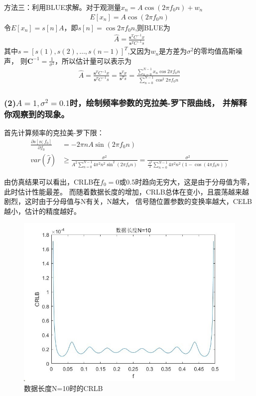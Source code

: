 \documentclass[fontset=windows]{article}
\numberwithin{figure}{section}
\begin{document}
方法三：利用BLUE求解。对于观测量\(x_n=A\cos(2\pi f_0 n)+w_n\)
\begin{align*}
	E[x_n]=A\cos(2\pi f_0 n)
\end{align*}
令\(E[x_n]=s[n]A\)，即\(s[n]=\cos 2\pi f_0 n\),则BLUE为
\begin{align*}
	\hat{A}=\frac{\mathbf{s}^TC^{-1}x}{\mathbf{s}^TC^{-1}s}
\end{align*}
其中\(s=[s(1),s(2),\ldots,s(n-1)]^T\),又因为\(w_n\)是方差为\(\sigma^2\)的零均值高斯噪声，
则\(\mathbf{C}^{-1}=\frac{1}{\sigma^2}\)，所以估计量可以表示为
\begin{align*}
	\hat{A}=\frac{\mathbf{s}^TC^{-1}x}{\mathbf{s}^TC^{-1}s}
	=\frac{\mathbf{s}^Tx}{\mathbf{s}^Ts}
	=\frac{\sum_{n=0}^{N-1}x_n \cos 2\pi f_0 n}{\sum_{n=0}^{N-1}\cos^2 2\pi f_0 n}
\end{align*}

\subsubsection*{(2)\(A=1,\sigma^2=0.1\)时，绘制频率参数的克拉美-罗下限曲线，
	并解释你观察到的现象。}

首先计算频率的克拉美-罗下限：
\begin{align*}
	\frac{\partial s[n;f_0]}{\partial f_0} & =-2\pi n A\sin(2\pi f_0 n) \\
	var(\hat{f})                           & \geq \frac{\sigma^2}
	{A^2\sum_{n=0}^{N-1}4\pi^2n^2\sin^2(2\pi f_0 n)}
	=\frac{\sigma^2}
	{\frac{A^2}{2}\sum_{n=0}^{N-1}4\pi^2n^2(1-\cos(4\pi f_0 n))}
\end{align*}

由仿真结果可以看出，CRLB在\(f_0=0\)或0.5时趋向无穷大，这是由于分母值为零，此时估计性能最差。
而随着数据长度的增加，CRLB总体在变小，且震荡越来越剧烈，这时由于分母值与N有关，N越大，
信号随位置参数的变换率越大，CELB越小，估计的精度越好。

\begin{figure}[H]
	\centering
	\includegraphics[scale=0.7]{fig1.jpg}
	\caption{数据长度N=10时的CRLB}
	\label{2.2.1}
\end{figure}
\end{document}
